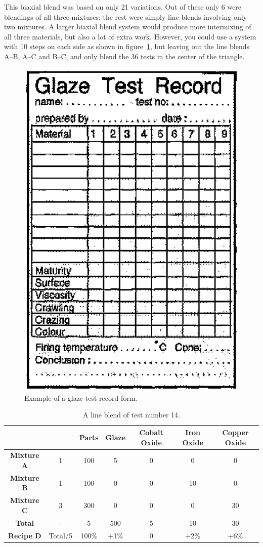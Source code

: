 This biaxial blend was based on only 21 variations. Out of these only 6 were 
blendings of all three mixtures; the rest were simply line blends involving 
only two mixtures. A larger biaxial blend system would produce more intermixing 
of all three materials, but also a lot of extra work. However, you could use a 
system with 10 steps on each side as shown in 
figure~\ref{fig:glazetestrecordform}, but leaving out the line blends A--B, 
A--C and B--C, and only blend the 36 
tests in the center of the triangle.
\begin{figure}[htbp!]
  \centering
  \includegraphics[width=0.45\linewidth]{img/glazetestrecordform.eps}
  \caption{Example of a glaze test record form.}
  \label{fig:glazetestrecordform}
\end{figure}
\begin{landscape}
  \begin{center}
\begin{table}\centering
    \renewcommand{\arraystretch}{1.5}
\begin{tabular}{|c||c|c|c|c|c|c|}\hline
&&\textbf{Parts}&\textbf{Glaze}&\textbf{Cobalt Oxide}&\textbf{Iron 
Oxide}&\textbf{Copper Oxide}\\\hline\hline
\textbf{Mixture A}&1&100&5&0&0&0\\\hline
\textbf{Mixture B}&1&100&0&0&10&0\\\hline
\textbf{Mixture C}&3&300&0&0&0&30\\\hline
\textbf{Total}&-&5&500&5&10&30\\\hline
\textbf{Recipe D}&Total/5&100\%&+1\%&0&+2\%&+6\%\\\hline
\end{tabular}
  \caption{A line blend of test number 14.}
\label{tab:lineblend14}
\end{table}
\end{center}
\end{landscape}
